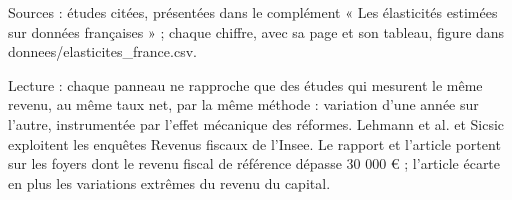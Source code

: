 Sources : études citées, présentées dans le complément « Les élasticités estimées sur données françaises » ; chaque chiffre, avec sa page et son tableau, figure dans donnees/elasticites\_france.csv.\par Lecture : chaque panneau ne rapproche que des études qui mesurent le même revenu, au même taux net, par la même méthode : variation d'une année sur l'autre, instrumentée par l'effet mécanique des réformes. Lehmann et al. et Sicsic exploitent les enquêtes Revenus fiscaux de l'Insee. Le rapport et l'article portent sur les foyers dont le revenu fiscal de référence dépasse 30 000 \euro{} ; l'article écarte en plus les variations extrêmes du revenu du capital.
